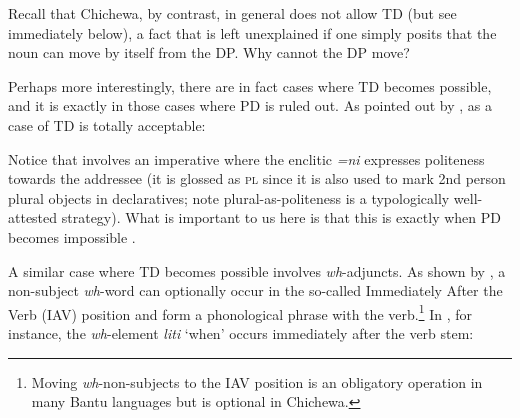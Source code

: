 \documentclass[output=paper,colorlinks,citecolor=brown
]{langscibook}
\begin{document}
 Recall that Chichewa, by contrast, in general does not allow TD  (but see immediately below), a fact that is left unexplained if one simply posits that the noun can move by itself from the DP. Why cannot the DP move?

Perhaps more interestingly, there are in fact cases where TD becomes possible, and it is exactly in those cases where PD is ruled out. As pointed out by \citet{downing2017phonology},  as a case of TD is totally acceptable:

\ea\label{ex:chen:imperative}
\begin{xlist}
  \label{ex:chen:goodTD}

  \label{ex:chen:badbadPD}
\end{xlist}
\z

 Notice that  involves an imperative where the enclitic \textit{=ni} expresses politeness towards the addressee (it is glossed as \textsc{pl} since it is also used to mark 2nd person plural objects in declaratives; note plural-as-politeness is a typologically well-attested strategy). What is important to us here is that this is exactly when PD becomes impossible .

A similar case where TD becomes possible involves \textit{wh}-adjuncts. As shown by \citet{downing2017phonology}, a non-subject \textit{wh}-word can optionally occur in the so-called Immediately After the Verb (\textsc{IAV}) position and form a phonological phrase with the verb.\footnote{Moving \textit{wh}-non-subjects to the IAV position is an obligatory operation in many Bantu languages but is optional in Chichewa.} In , for instance, the \textit{wh}-element \textit{liti} `when' occurs immediately after the verb stem:
\end{document}
